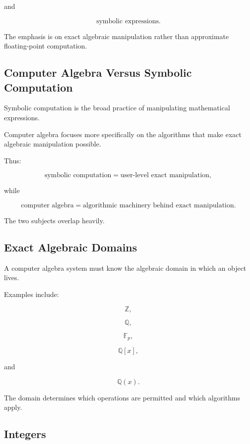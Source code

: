 and

\[
\boxed{
\text{symbolic expressions}.
}
\]

The emphasis is on exact algebraic manipulation rather than approximate
floating-point computation.

\subsection{Computer Algebra Versus Symbolic Computation}
\label{subsec:computer-algebra-vs-symbolic}

Symbolic computation is the broad practice of manipulating mathematical
expressions.

Computer algebra focuses more specifically on the algorithms that make
exact algebraic manipulation possible.

Thus:

\[
\boxed{
\text{symbolic computation}
=
\text{user-level exact manipulation},
}
\]

while

\[
\boxed{
\text{computer algebra}
=
\text{algorithmic machinery behind exact manipulation}.
}
\]

The two subjects overlap heavily.

\subsection{Exact Algebraic Domains}
\label{subsec:exact-algebraic-domains}

A computer algebra system must know the algebraic domain in which an object
lives.

Examples include:

\[
\boxed{
\mathbb{Z},
}
\]

\[
\boxed{
\mathbb{Q},
}
\]

\[
\boxed{
\mathbb{F}_p,
}
\]

\[
\boxed{
\mathbb{Q}[x],
}
\]

and

\[
\boxed{
\mathbb{Q}(x).
}
\]

The domain determines which operations are permitted and which algorithms
apply.

\subsection{Integers}
\label{subsec:computer-algebra-integers}

